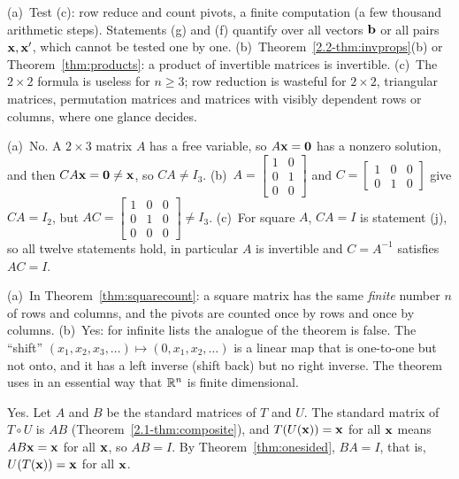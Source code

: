 \documentclass[11pt]{article}
\begin{document}
\begin{description}[leftmargin=0pt,itemsep=5pt]
  \item[Pause and think \ref{think:cheapest}.] (a)~Test (c): row reduce and count pivots, a finite computation (a few thousand arithmetic steps). Statements (g) and (f) quantify over all vectors $\mathbf{b}$ or all pairs $\mathbf{x},\mathbf{x}'$, which cannot be tested one by one. (b)~Theorem~\ref{2.2-thm:invprops}(b) or Theorem~\ref{thm:products}: a product of invertible matrices is invertible. (c)~The $2\times2$ formula is useless for $n\ge3$; row reduction is wasteful for $2\times2$, triangular matrices, permutation matrices and matrices with visibly dependent rows or columns, where one glance decides.
  \item[Pause and think \ref{think:leftright}.] (a)~No. A $2\times3$ matrix $A$ has a free variable, so $A\mathbf{x}=\mathbf{0}$ has a nonzero solution, and then $CA\mathbf{x}=\mathbf{0}\neq\mathbf{x}$, so $CA\neq I_3$. (b)~$A=\begin{bmatrix}1&0\\0&1\\0&0\end{bmatrix}$ and $C=\begin{bmatrix}1&0&0\\0&1&0\end{bmatrix}$ give $CA=I_2$, but $AC=\begin{bmatrix}1&0&0\\0&1&0\\0&0&0\end{bmatrix}\neq I_3$. (c)~For square $A$, $CA=I$ is statement (j), so all twelve statements hold, in particular $A$ is invertible and $C=A^{-1}$ satisfies $AC=I$.
  \item[Pause and think \ref{think:finite}.] (a)~In Theorem~\ref{thm:squarecount}: a square matrix has the same \emph{finite} number $n$ of rows and columns, and the pivots are counted once by rows and once by columns. (b)~Yes: for infinite lists the analogue of the theorem is false. The ``shift'' $(x_1,x_2,x_3,\dots)\mapsto(0,x_1,x_2,\dots)$ is a linear map that is one-to-one but not onto, and it has a left inverse (shift back) but no right inverse. The theorem uses in an essential way that $\mathbb{R}^n$ is finite dimensional.
  \item[Pause and think \ref{think:ontoinv}.] Yes. Let $A$ and $B$ be the standard matrices of $T$ and $U$. The standard matrix of $T\circ U$ is $AB$ (Theorem~\ref{2.1-thm:composite}), and $T(U(\mathbf{x}))=\mathbf{x}$ for all $\mathbf{x}$ means $AB\mathbf{x}=\mathbf{x}$ for all $\mathbf{x}$, so $AB=I$. By Theorem~\ref{thm:onesided}, $BA=I$, that is, $U(T(\mathbf{x}))=\mathbf{x}$ for all $\mathbf{x}$.

\end{description}
\end{document}
